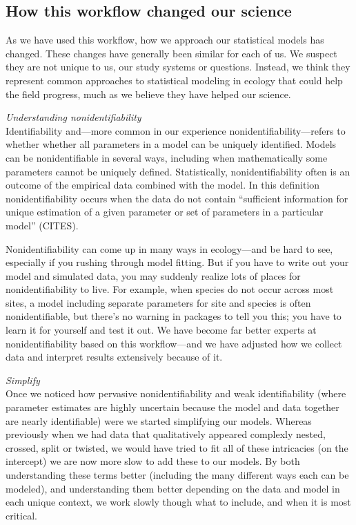 \documentclass[11pt]{article}
\begin{document}
\subsection{How this workflow changed our science} %

As we have used this workflow, how we approach our statistical models has changed. These changes have generally been similar for each of us. We suspect they are not unique to us, our study systems or questions. Instead, we think they represent common approaches to statistical modeling in ecology that could help the field progress, much as we believe they have helped our science. 

 \emph{Understanding nonidentifiability} \\

Identifiability and---more common in our experience nonidentifiability---refers to whether whether all parameters in a model can be uniquely identified. Models can be nonidentifiable in several ways, including when mathematically some parameters cannot be uniquely defined. Statistically, nonidentifiability often is an outcome of the empirical data combined with the model. In this definition nonidentifiability occurs when the data do not contain ``sufficient information for unique estimation of a given parameter or set of parameters in a particular model'' (CITES). 

Nonidentifiability can come up in many ways in ecology---and be hard to see, especially if you rushing through model fitting. But if you have to write out your model and simulated data, you may suddenly realize lots of places for nonidentifiability to live. For example, when species do not occur across most sites, a model including separate parameters for site and species is often nonidentifiable, but there's no warning in packages to tell you this; you have to learn it for yourself and test it out. We have become far better experts at nonidentifiability based on this workflow---and we have adjusted how we collect data and interpret results extensively because of it. 

 \emph{Simplify} \\
Once we noticed how pervasive nonidentifiability and weak identifiability (where parameter estimates are highly uncertain because the model and data together are nearly identifiable) were we started simplifying our models. Whereas previously when we had data that qualitatively appeared complexly nested, crossed, split or twisted, we would have tried to fit all of these intricacies (on the intercept) we are now more slow to add these to our models. By both understanding these terms better (including the many different ways each can be modeled), and understanding them better depending on the data and model in each unique context, we work slowly though what to include, and when it is most critical.
\end{document}
